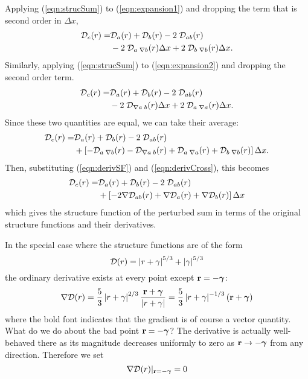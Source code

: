 \documentclass[11pt, oneside]{article}   	%
\begin{document}
\begin{appendix}
Applying (\ref{eqn:strucSum}) to (\ref{eqn:expansion1}) and dropping the term that is second order in $\Delta x$,
\begin{align}
{\cal D}_c (r) = &{\cal D}_a (r) +  {\cal D}_b(r) - 2\; {\cal D}_{a b} (r) \nonumber \\
                     & - 2 \; {\cal D}_{a\;\nabla b}(r) \Delta x + 2 \; {\cal D}_{b \;\nabla b}(r) \Delta x.
\end{align}
Similarly, applying (\ref{eqn:strucSum})  to (\ref{eqn:expansion2}) and dropping the second order term.
\begin{align}
{\cal D}_c (r) = &{\cal D}_a (r) + {\cal D}_b(r) - 2\; {\cal D}_{a b}(r) \nonumber \\
                     & - 2 \; {\cal D}_{\nabla a \; b}(r) \Delta x + 2\; {\cal D}_{a \; \nabla a}(r) \Delta x.
\end{align}
Since these two quantities are equal, we can take their average:
\begin{align}
{\cal D}_c (r) =& {\cal D}_a (r) + {\cal D}_b(r) - 2\; {\cal D}_{a b}(r) \nonumber \\
                     & + \left[ - {\cal D}_{a \; \nabla b}(r) - {\cal D}_{\nabla a\; b}(r) + {\cal D}_{a \; \nabla a}(r) + {\cal D}_{b \; \nabla b}(r) \right] \Delta x.
\end{align}
Then, substituting (\ref{eqn:derivSF}) and (\ref{eqn:derivCross}), this becomes
\begin{align}
\label{eqn:SFderiv}
{\cal D}_c (r) =& {\cal D}_a (r) + {\cal D}_b(r) - 2\; {\cal D}_{a b}(r) \nonumber \\
                       & + \left[ -2\nabla {\cal D}_{ab}(r) + \nabla {\cal D}_{a}(r) + \nabla {\cal D}_{b}(r) \right] \Delta x
\end{align}
which gives the structure function of the perturbed sum in terms of the original structure functions and their derivatives.

In the special case where the structure functions are of the form
\begin{equation}
{\cal D}(r) = \left| r + \gamma \right|^{5/3} + \left| \gamma \right|^{5/3}
\end{equation}
the ordinary derivative exists at every point except ${\bf r}=-{\boldsymbol \gamma}$:
\begin{equation}
\nabla {\cal D}(r) = \frac{5}{3} \left| r + \gamma \right|^{2/3} \frac{\bf r+\boldsymbol\gamma}{|r+\gamma|}
=\frac{5}{3} \left| r + \gamma \right|^{-1/3} \left({\bf r}+{\boldsymbol\gamma}\right)
\end{equation}
where the bold font indicates that the gradient is of course a vector quantity. What do we do about the bad point ${\bf r}=-{\boldsymbol \gamma}$? The derivative is actually well-behaved there as its magnitude decreases uniformly to zero as ${\bf r}\rightarrow -{\boldsymbol\gamma}$ from any direction. Therefore we set
\begin{equation}
\nabla {\cal D}(r)|_{\bf r=-\boldsymbol \gamma} = 0
\end{equation} 

\end{appendix}
\end{document}
